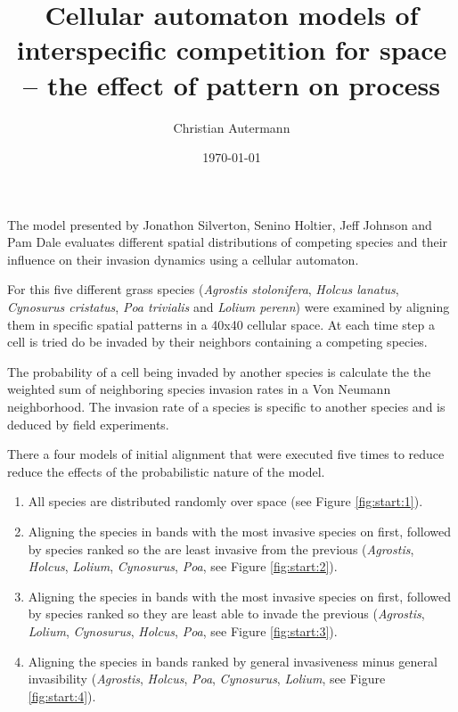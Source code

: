\documentclass[12pt,a4paper,parskip]{scrartcl}
\title{\LARGE{Cellular automaton models of interspecific competition for space -- the effect of pattern on process}}
\author{\large{Christian Autermann}\\\large{\mail{autermann@uni-muenster.de}}}
\date{\large{\today}}
\begin{document}
\maketitle
\onehalfspacing

The model presented by Jonathon Silverton, Senino Holtier, Jeff Johnson and Pam Dale evaluates different spatial distributions of competing species and their influence on their invasion dynamics using a cellular automaton.

For this five different grass species (\emph{Agrostis stolonifera}, \emph{Holcus lanatus}, \emph{Cynosurus cristatus}, \emph{Poa trivialis} and \emph{Lolium perenn}) were examined by aligning them in specific spatial patterns in a 40x40 cellular space. At each time step a cell is tried do be invaded by their neighbors containing a competing species.

The probability of a cell being invaded by another species is calculate the the weighted sum of neighboring species invasion rates in a Von Neumann neighborhood. The invasion rate of a species is specific to another species and is deduced by field experiments.

There a four models of initial alignment that were executed five times to reduce reduce the effects of the probabilistic nature of the model.

\begin{enumerate}
    \item All species are distributed randomly over space (see Figure \ref{fig:start:1}).
    \item Aligning the species in bands with the most invasive species on first, followed by species ranked so the are least invasive from the previous (\emph{Agrostis}, \emph{Holcus}, \emph{Lolium}, \emph{Cynosurus}, \emph{Poa}, see Figure \ref{fig:start:2}).
    \item Aligning the species in bands with the most invasive species on first, followed by species ranked so they are least able to invade the previous (\emph{Agrostis}, \emph{Lolium}, \emph{Cynosurus}, \emph{Holcus}, \emph{Poa}, see Figure \ref{fig:start:3}).
    \item Aligning the species in bands ranked by general invasiveness minus general invasibility (\emph{Agrostis}, \emph{Holcus}, \emph{Poa}, \emph{Cynosurus}, \emph{Lolium}, see Figure \ref{fig:start:4}).
\end{enumerate}
\end{document}
